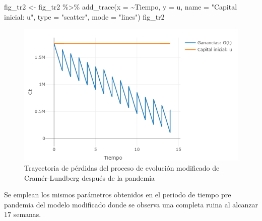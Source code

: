 \documentclass[
  us-letterpaper,
]{scrreprt}
\newenvironment{Shaded}{\begin{snugshade}}{\end{snugshade}}
\newcommand{\AttributeTok}[1]{\textcolor[rgb]{0.40,0.45,0.13}{#1}}
\newcommand{\FunctionTok}[1]{\textcolor[rgb]{0.28,0.35,0.67}{#1}}
\newcommand{\NormalTok}[1]{\textcolor[rgb]{0.00,0.23,0.31}{#1}}
\newcommand{\OtherTok}[1]{\textcolor[rgb]{0.00,0.23,0.31}{#1}}
\newcommand{\SpecialCharTok}[1]{\textcolor[rgb]{0.37,0.37,0.37}{#1}}
\newcommand{\StringTok}[1]{\textcolor[rgb]{0.13,0.47,0.30}{#1}}
\theoremstyle{plain}
\theoremstyle{plain}
\theoremstyle{definition}
\theoremstyle{remark}
\begin{document}
\begin{Shaded}
\begin{Highlighting}[]
\NormalTok{fig\_tr2 }\OtherTok{\textless{}{-}}\NormalTok{ fig\_tr2 }\SpecialCharTok{\%\textgreater{}\%} \FunctionTok{add\_trace}\NormalTok{(}\AttributeTok{x =} \SpecialCharTok{\textasciitilde{}}\NormalTok{Tiempo, }\AttributeTok{y =}\NormalTok{ u,}
        \AttributeTok{name =} \StringTok{"Capital inicial: u"}\NormalTok{, }
        \AttributeTok{type =} \StringTok{"scatter"}\NormalTok{, }\AttributeTok{mode =} \StringTok{"lines"}\NormalTok{)}
\NormalTok{fig\_tr2}
\end{Highlighting}
\end{Shaded}

\begin{figure}

\includegraphics[width=6.25in,height=\textheight,keepaspectratio]{trayectoria2pdf.png}

\caption{\label{fig-fig-trayectoria2pdf}Trayectoria de pérdidas del
proceso de evolución modificado de Cramér-Lundberg después de la
pandemia}

\end{figure}%

Se emplean los mismos parámetros obtenidos en el periodo de tiempo pre
pandemia del modelo modificado donde se observa una completa ruina al
alcanzar \(17\) semanas.
\end{document}
